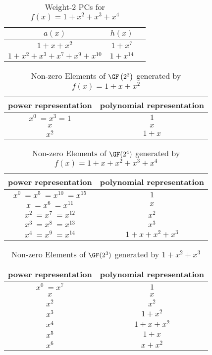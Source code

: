 \begin{table}[htbp]
		\caption{Weight-2 PCs for $f(x)=1+x^2+x^3+x^4$}
		\centering
		\begin{tabular}{c c c} 
			\toprule
			$a(x)$ & $h(x)$ \\ [0.5ex] 
			\midrule
			$1+x+x^2$
			& $1+x^{7}$ \\
			\hline
			$1+x^2+x^3+x^7+x^9+x^{10}$
			& $1+x^{14}$ \\
			\bottomrule
		\end{tabular}
		\label{novelTab-extra2}
	\end{table}


\begin{table}[htbp]
 \caption{Non-zero Elements of $\GF \left(2^2\right)$ generated by $f(x)=1+x+x^2$}
\centering
 \begin{tabular}{c c} 
 \toprule
 power representation & polynomial representation \\ [0.5ex] 
 \midrule
$x^0~=x^3=1$ & $1$\\
\hline
$x$ & $x$\\
\hline
$x^2$ &  $1+x$\\
\bottomrule
 \end{tabular}
 \label{novelTab7}
\end{table}


\begin{table}[htbp]
 \caption{Non-zero Elements of $\GF (2^4)$ generated by $f(x)=1+x+x^2+x^3+x^4$}
\centering
 \begin{tabular}{c c} 
 \toprule
 power representation & polynomial representation \\ [0.5ex] 
\midrule
$x^0~=x^5~=x^{10}~=x^{15}$ & $1$\\
\hline
$x~=x^6~=x^{11}$ & $x$\\
\hline
$x^2~=x^7~=x^{12}$ &  $x^2$\\
\hline
$x^3~=x^8~=x^{13}$ &  $x^3$\\
\hline
$x^4~=x^9~=x^{14}$ &  $1+x+x^2+x^3$\\
 \bottomrule
 \end{tabular}
 \label{novelTabWt3-2}
\end{table}

\begin{table}[htbp]
\caption{Non-zero Elements of $\GF (2^3)$ generated by $1+x^2+x^3$}
\centering
\begin{tabular}{c c} 
\toprule
power representation & polynomial representation \\ [0.5ex] 
\midrule
$x^0~=x^7$ & $1$\\
\hline
$x$ & $x$\\
\hline
$x^2$ &  $x^2$\\
\hline
$x^3$ &  $1+x^2$\\
\hline
$x^4$ &  $1+x+x^2$\\
\hline
$x^5$ &  $1+x$\\
\hline
$x^6$ &  $x+x^2$\\
\bottomrule
\end{tabular}
\label{novelTabWt3-5}
\end{table}

